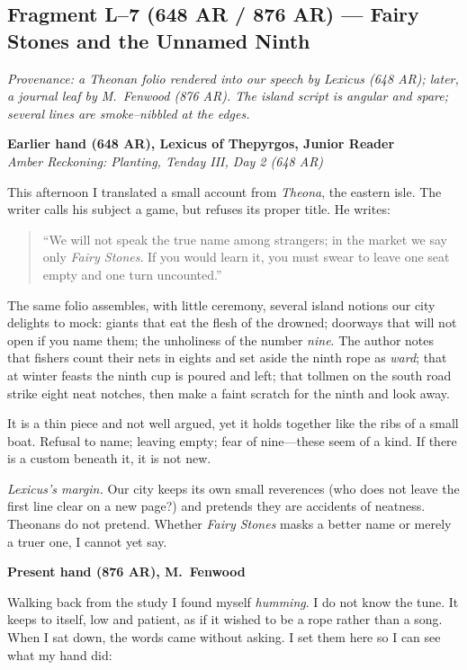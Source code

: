 \documentclass[11pt]{article}
\begin{document}
\subsection{Fragment L--7 (648 AR / 876 AR) — Fairy Stones and the Unnamed Ninth}
\label{frag:l7}

\noindent\textit{Provenance: a Theonan folio rendered into our speech by Lexicus (648 AR); later, a journal leaf by M.\ Fenwood (876 AR). The island script is angular and spare; several lines are smoke–nibbled at the edges.}

\medskip
\noindent\textbf{Earlier hand (648 AR), Lexicus of Thepyrgos, Junior Reader}\\
\noindent\textit{Amber Reckoning: Planting, Tenday III, Day 2 (648 AR)}

This afternoon I translated a small account from \textit{Theona}, the eastern isle. The writer calls his subject a game, but refuses its proper title. He writes:

\begin{quote}\small
“We will not speak the true name among strangers; in the market we say only \emph{Fairy Stones}. If you would learn it, you must swear to leave one seat empty and one turn uncounted.”
\end{quote}

The same folio assembles, with little ceremony, several island notions our city delights to mock: giants that eat the flesh of the drowned; doorways that will not open if you name them; the unholiness of the number \textit{nine}. The author notes that fishers count their nets in eights and set aside the ninth rope as \emph{ward}; that at winter feasts the ninth cup is poured and left; that tollmen on the south road strike eight neat notches, then make a faint scratch for the ninth and look away.

It is a thin piece and not well argued, yet it holds together like the ribs of a small boat. Refusal to name; leaving empty; fear of nine—these seem of a kind. If there is a custom beneath it, it is not new.

\medskip
\noindent\textit{Lexicus’s margin.} Our city keeps its own small reverences (who does not leave the first line clear on a new page?) and pretends they are accidents of neatness. Theonans do not pretend. Whether \emph{Fairy Stones} masks a better name or merely a truer one, I cannot yet say.

\medskip
\noindent\textbf{Present hand (876 AR), M.\ Fenwood}

Walking back from the study I found myself \emph{humming}. I do not know the tune. It keeps to itself, low and patient, as if it wished to be a rope rather than a song. When I sat down, the words came without asking. I set them here so I can see what my hand did:
\end{document}
